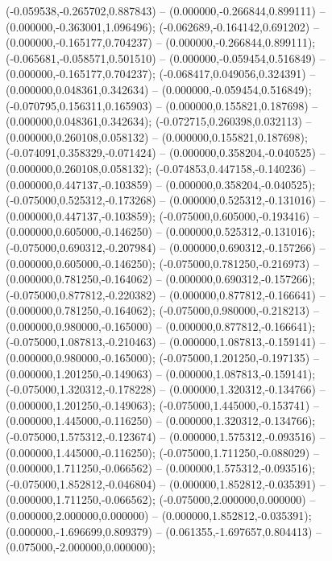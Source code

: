  (-0.059538,-0.265702,0.887843) -- (0.000000,-0.266844,0.899111) -- (0.000000,-0.363001,1.096496);
 (-0.062689,-0.164142,0.691202) -- (0.000000,-0.165177,0.704237) -- (0.000000,-0.266844,0.899111);
 (-0.065681,-0.058571,0.501510) -- (0.000000,-0.059454,0.516849) -- (0.000000,-0.165177,0.704237);
 (-0.068417,0.049056,0.324391) -- (0.000000,0.048361,0.342634) -- (0.000000,-0.059454,0.516849);
 (-0.070795,0.156311,0.165903) -- (0.000000,0.155821,0.187698) -- (0.000000,0.048361,0.342634);
 (-0.072715,0.260398,0.032113) -- (0.000000,0.260108,0.058132) -- (0.000000,0.155821,0.187698);
 (-0.074091,0.358329,-0.071424) -- (0.000000,0.358204,-0.040525) -- (0.000000,0.260108,0.058132);
 (-0.074853,0.447158,-0.140236) -- (0.000000,0.447137,-0.103859) -- (0.000000,0.358204,-0.040525);
 (-0.075000,0.525312,-0.173268) -- (0.000000,0.525312,-0.131016) -- (0.000000,0.447137,-0.103859);
 (-0.075000,0.605000,-0.193416) -- (0.000000,0.605000,-0.146250) -- (0.000000,0.525312,-0.131016);
 (-0.075000,0.690312,-0.207984) -- (0.000000,0.690312,-0.157266) -- (0.000000,0.605000,-0.146250);
 (-0.075000,0.781250,-0.216973) -- (0.000000,0.781250,-0.164062) -- (0.000000,0.690312,-0.157266);
 (-0.075000,0.877812,-0.220382) -- (0.000000,0.877812,-0.166641) -- (0.000000,0.781250,-0.164062);
 (-0.075000,0.980000,-0.218213) -- (0.000000,0.980000,-0.165000) -- (0.000000,0.877812,-0.166641);
 (-0.075000,1.087813,-0.210463) -- (0.000000,1.087813,-0.159141) -- (0.000000,0.980000,-0.165000);
 (-0.075000,1.201250,-0.197135) -- (0.000000,1.201250,-0.149063) -- (0.000000,1.087813,-0.159141);
 (-0.075000,1.320312,-0.178228) -- (0.000000,1.320312,-0.134766) -- (0.000000,1.201250,-0.149063);
 (-0.075000,1.445000,-0.153741) -- (0.000000,1.445000,-0.116250) -- (0.000000,1.320312,-0.134766);
 (-0.075000,1.575312,-0.123674) -- (0.000000,1.575312,-0.093516) -- (0.000000,1.445000,-0.116250);
 (-0.075000,1.711250,-0.088029) -- (0.000000,1.711250,-0.066562) -- (0.000000,1.575312,-0.093516);
 (-0.075000,1.852812,-0.046804) -- (0.000000,1.852812,-0.035391) -- (0.000000,1.711250,-0.066562);
 (-0.075000,2.000000,0.000000) -- (0.000000,2.000000,0.000000) -- (0.000000,1.852812,-0.035391);
 (0.000000,-1.696699,0.809379) -- (0.061355,-1.697657,0.804413) -- (0.075000,-2.000000,0.000000);
